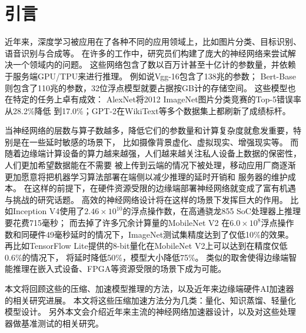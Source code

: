\section{引言}
近年来，深度学习被应用在了各种不同的应用领域上，比如图片分类、目标识别、语音识别与合成等。
在许多的工作中，研究员们构建了庞大的神经网络来尝试解决一个领域内的问题。
这些网络包含了数以百万计甚至十亿计的参数量，并依赖于服务端GPU/TPU来进行推理。
例如说Vgg-16\cite{simonyan2014very}包含了138兆的参数；
Bert-Base\cite{devlin2018bert}则包含了110兆的参数，32位浮点模型就要占据按GB计的存储空间。
这些模型也在特定的任务上卓有成效：
AlexNet\cite{krizhevsky2012imagenet}将2012 ImageNet图片分类竞赛的Top-5错误率从28.2\%降低
到17.0\%；GPT-2\cite{radford2019language}在WikiText等多个数据集上都刷新了成绩标杆。

当神经网络的层数与算子数越多，降低它们的参数量和计算复杂度就愈发重要，特别是在一些延时敏感的场景下，
比如摄像背景虚化、虚拟现实、增强现实等。
而随着边缘端计算设备的算力越来越强，人们越来越关注私人设备上数据的保密性，人们更加希望数据能在不需要
被上传到云端的情况下被处理，移动应用厂商逐渐更加愿意将把机器学习算法部署在端侧以减少推理的延时开销和
服务器的维护成本。
在这样的前提下，在硬件资源受限的边缘端部署神经网络就变成了富有机遇与挑战的研究话题。
高效的神经网络设计将在这样的场景下发挥巨大的作用。
比如Inception V4使用了$2.46\times 10^{10}$的浮点操作数，在高通骁龙855 SoC处理器上推理要花费715毫秒；
而去掉了许多冗余计算量的MobileNet V2\cite{sandler2018mobilenetv2}
在$6.0\times 10^8$浮点操作数和同硬件49毫秒延时的情况下，ImageNet测试集精度达到了仅低10\%的效果。
再比如TensorFlow Lite提供的8-bit量化在MobileNet V2上可以达到在精度仅低0.6\%的情况下，
将延时降低50\%，模型大小降低75\%。
类似的取舍使得边缘端智能推理在嵌入式设备、FPGA等资源受限的场景下成为可能。

本文将回顾这些的压缩、加速模型推理的方法，以及近年来边缘端硬件AI加速器的相关研究进展。
本文将这些压缩加速方法分为几类：量化、知识蒸馏、轻量化模型设计。
另外本文会介绍近年来主流的神经网络加速器设计，以及对这些处理器做基准测试的相关研究。